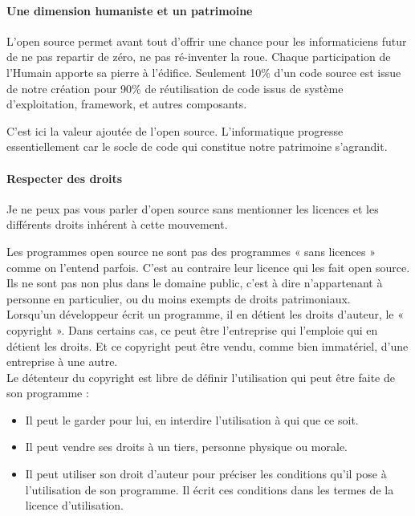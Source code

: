 			\paragraph{Une dimension humaniste et un patrimoine\\}

			L'open source permet avant tout d'offrir une chance pour les informaticiens futur de ne pas repartir de zéro, ne pas ré-inventer la roue. Chaque participation de l'Humain apporte sa pierre à l'édifice.
			Seulement 10\% d'un code source est issue de notre création pour 90\% de réutilisation de code issus de système d'exploitation, \gls{framework}, et autres composants.

			C'est ici la valeur ajoutée de l'open source. L'informatique progresse essentiellement car le socle de code qui constitue notre patrimoine s'agrandit.

			\paragraph{Respecter des droits\\}

			Je ne peux pas vous parler d'open source sans mentionner les licences et les différents droits inhérent à cette mouvement.

			Les programmes open source ne sont pas des programmes « sans licences » comme on l'entend parfois. C'est au contraire leur licence qui les fait open source. Ils ne sont pas non plus dans le domaine public, c'est à dire n'appartenant à personne en particulier, ou du moins exempts de droits patrimoniaux.\\

			Lorsqu'un développeur écrit un programme, il en détient les droits d'auteur, le « copyright ». Dans certains cas, ce peut être l'entreprise qui l'emploie qui en détient les droits. Et ce copyright peut être vendu, comme bien immatériel, d'une entreprise à une autre. \\

			Le détenteur du copyright est libre de définir l'utilisation qui peut être faite de son programme : 

			\begin{itemize}[label=\textbullet, font=\LARGE \color{burntorange}]
		
			\item Il peut le garder pour lui, en interdire l'utilisation à qui que ce soit.

			\item Il peut vendre ses droits à un tiers, personne physique ou morale.

			\item Il peut utiliser son droit d'auteur pour préciser les conditions qu'il pose à l'utilisation de son programme. Il écrit ces conditions dans les termes de la licence d'utilisation.

			\end{itemize}


